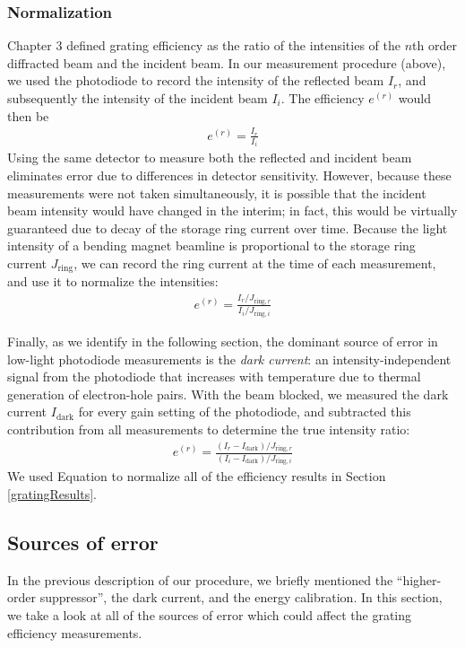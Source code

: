 \subsubsection{Normalization}
\label{normalizationEff}
Chapter 3 defined grating efficiency as the ratio of the intensities of the $n$th order diffracted beam and the incident beam.  In our measurement procedure (above), we used the photodiode to record the intensity of the reflected beam $I_r$, and subsequently the intensity of the incident beam $I_i$.  The efficiency $e^{(r)}$ would then be
\begin{align}
e^{(r)} = \frac{I_r}{I_i}
\end{align}
Using the same detector to measure both the reflected and incident beam eliminates error due to differences in detector sensitivity.  However, because these measurements were not taken simultaneously, it is possible that the incident beam intensity would have changed in the interim; in fact, this would be virtually guaranteed due to decay of the storage ring current over time.  Because the light intensity of a bending magnet beamline is proportional to the storage ring current $J_{\mathrm{ring}}$, we can record the ring current at the time of each measurement, and use it to normalize the intensities:
\begin{align}
e^{(r)} = \frac{I_r / J_{\mathrm{ring},r}}{I_i / J_{\mathrm{ring},i}}
\end{align}

Finally, as we identify in the following section, the dominant source of error in low-light photodiode measurements is the \emph{dark current}: an intensity-independent signal from the photodiode that increases with temperature due to thermal generation of electron-hole pairs.  With the beam blocked, we measured the dark current $I_{\mathrm{dark}}$ for every gain setting of the photodiode, and subtracted this  contribution from all measurements to determine the true intensity ratio:
\begin{align}
e^{(r)} = \frac{(I_r - I_{\mathrm{dark}}) / J_{\mathrm{ring},r}}{(I_i - I_{\mathrm{dark}})/ J_{\mathrm{ring},i}}
\label{effNormalization}
\end{align}
We used Equation  to normalize all of the efficiency results in Section \ref{gratingResults}.

\subsection{Sources of error}
\label{sourcesOfError}
In the previous description of our procedure, we briefly mentioned the ``higher-order suppressor'', the dark current, and the energy calibration.  In this section, we take a look at all of the sources of error which could affect the grating efficiency measurements.

